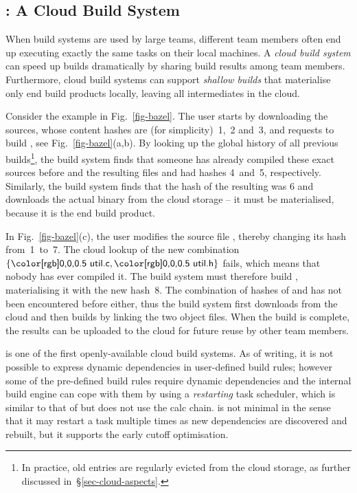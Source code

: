 \subsection{\Bazel: A Cloud Build System}\label{sec-background-bazel}

When build systems are used by large teams, different team members often end up
executing exactly the same tasks on their local machines. A \emph{cloud build
system} can speed up builds dramatically by sharing build results
among team members. Furthermore, cloud build systems can support \emph{shallow
builds} that materialise only end build products locally, leaving all
intermediates in the cloud.

Consider the example in Fig.~\ref{fig-bazel}. The user starts by downloading the
sources, whose content hashes are (for simplicity)~1,~2 and~3, and requests to
build , see Fig.~\ref{fig-bazel}(a,b). By looking up the global
history of all previous builds\footnote{In practice, old entries are regularly
evicted from the cloud storage, as further discussed
in~\S\ref{sec-cloud-aspects}.}, the build system finds that someone has already
compiled these exact sources before and the resulting files  and
 had hashes 4~and~5, respectively. Similarly, the build system finds
that the hash of the resulting  was 6 and downloads the actual
binary from the cloud storage -- it must be materialised, because it is the end
build product.

In Fig.~\ref{fig-bazel}(c), the user modifies the source file ,
thereby changing its hash from~1~to~7. The cloud lookup of the new combination
$\{\cmd{util.c}, \cmd{util.h}\}$ fails, which means that nobody has ever
compiled it. The build system must therefore build , materialising
it with the new hash~8. The combination of hashes of  and
 has not been encountered before either, thus the build system first
downloads  from the cloud and then builds  by linking
the two object files. When the build is complete, the results can be uploaded to
the cloud for future reuse by other team members.

\Bazel is one of the first openly-available cloud build systems.
As of writing, it is not possible to express dynamic dependencies in
user-defined build rules; however some of the pre-defined build rules require
dynamic dependencies and the internal build engine can cope with them by using
a \emph{restarting} task scheduler, which is similar to that of \Excel but does
not use the calc chain. \Bazel is not minimal in the sense that it may restart a
task multiple times as new dependencies are discovered and rebuilt, but it
supports the early cutoff optimisation.


